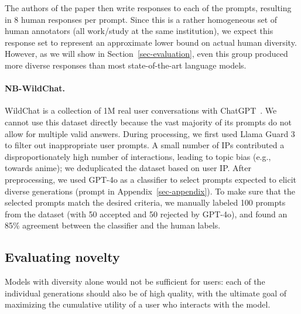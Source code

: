 The authors of the paper then write responses to each of the prompts, resulting in 8 human responses per prompt.
Since this is a rather homogeneous set of human annotators (all work/study at the same institution), we expect this response set to represent an approximate lower bound on actual human diversity.
However, as we will show in Section~\ref{sec-evaluation}, even this group produced more diverse responses than most state-of-the-art language models.

\paragraph{NB-WildChat.}
WildChat is a collection of 1M real user conversations with ChatGPT~\cite{zhao2023wildchat}.
We cannot use this dataset directly because the vast majority of its prompts do not allow for multiple valid answers.
During processing, we first used Llama Guard 3~\cite{chi2024} to filter out inappropriate user prompts.
A small number of IPs contributed a disproportionately high number of interactions, leading to topic bias (e.g., towards anime); we deduplicated the dataset based on user IP.
After preprocessing, we used GPT-4o as a classifier to select prompts expected to elicit diverse generations (prompt in Appendix~\ref{sec-appendix}).
To make sure that the selected prompts match the desired criteria, we manually labeled 100 prompts from the dataset (with 50 accepted and 50 rejected by GPT-4o), and found an 85\% agreement between the classifier and the human labels.


\subsection{Evaluating novelty}

Models with diversity alone would not be sufficient for users: each of the individual generations should also be of high quality, with the ultimate goal of maximizing the cumulative utility of a user who interacts with the model.

